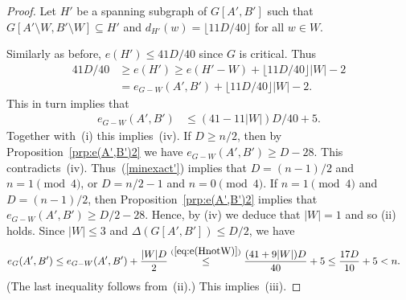 \documentclass{memo-l}
\def\COMMENT#1{}
\numberwithin{section}{chapter}
\numberwithin{equation}{section}
\numberwithin{firstthm}{section}
\numberwithin{figure}{section}
\begin{document}
{\begin{proof}
Let $H'$ be a spanning subgraph of $G[A',B']$ such that $G[A'\setminus W,B'\setminus W]\subseteq H'$ and
$d_{H'}(w)= \lfloor 11D/40 \rfloor$ for all $w\in W$.%
    \COMMENT{Such a $H'$ can be obtained by starting with $G[A'\cap W,B'\cap W]+ G[A'\setminus W,B'\setminus W]$ and adding
suitable further edges between $W$ and $V(G)\setminus W$.}
Similarly as before, $e(H') \le 41D/40$ since $G$ is critical. Thus 
\begin{align*}
	41D/40 & \ge e(H') \ge e ( H'- W ) + \lfloor 11D / 40 \rfloor |W| - 2\\
	& = e_{G- W}(A',B') + \lfloor 11D / 40 \rfloor |W| - 2.
\end{align*}
This in turn implies that
\begin{align}
e_{G- W}(A',B') & \le (41 - 11 |W|)D / 40 + 5 \label{eq:e(HnotW)}.
\end{align}
Together with~(i) this implies~(iv).
If $D \ge n/2$, then by Proposition~\ref{prp:e(A',B')2} we have $e_{G- W}(A',B')  \ge D - 28$.
This contradicts~(iv). Thus~(\ref{minexact'}) implies that $D = (n-1)/2$ and $n = 1 \pmod{4}$, or $D = n/2-1$ and $n = 0 \pmod{4}$.
If $n = 1 \pmod 4$ and $D=(n-1)/2$, then Proposition~\ref{prp:e(A',B')2} implies that $e_{G-W}(A',B')\ge D/2-28$.
Hence, by (iv) we deduce that $|W| =1$ and so (ii) holds.
Since $|W| \le 3$ and $\Delta(G[A',B']) \le D/2$, we have
\begin{align*}
	e_G (A',B') & \le e_{G- W}(A',B') + \frac{|W| D}2
		 \stackrel{(\ref{eq:e(HnotW)})}{\le} \frac{(41+9|W|)D}{40}+5 \le \frac{17D}{10}+5 <n.
\end{align*}
(The last inequality follows from~(ii).) This implies~(iii).
\end{proof}




















}
\end{document}
